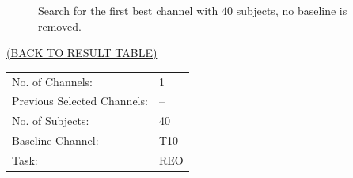 \documentclass[oneside, a4paper,10pt]{report}
\begin{document}
\begin{figure}[H]
  \caption{Search for the first best channel with $40$ subjects, no baseline is removed.}
  \label{fg:1Ch_S40_B0}
\end{figure}


\newpage

\hspace*{12cm}\hyperlink{tab:TestResults}{(BACK TO RESULT TABLE)}

\bigskip
\bigskip

\begin{tabular}{ll}
  No. of Channels: & 1\\
  Previous Selected Channels: & --\\
  No. of Subjects: & 40\\
  Baseline Channel: & T10\\
  Task:	& REO 
\end{tabular}

\bigskip
\end{document}
